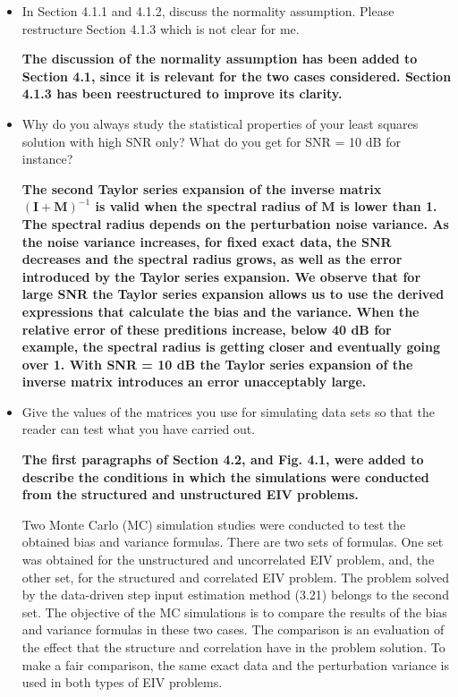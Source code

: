 \documentclass[11pt]{article}
\begin{document}
\begin{itemize}
    \item  In Section 4.1.1 and 4.1.2, discuss the normality assumption. Please restructure Section 4.1.3 which is not clear for me. 
    
    {\bfseries The discussion of the normality assumption has been added to Section 4.1, since it is relevant for the two cases considered. Section 4.1.3 has been reestructured to improve its clarity.}
    
    \item  Why do you always study the statistical properties of your least squares solution with high SNR only? What do you get for SNR = 10 dB for instance? 
    
    {\bfseries The second Taylor series expansion of the inverse matrix $(\mathbf{I} + \mathbf{M})^{-1}$ is valid when the spectral radius of $\mathbf{M}$ is lower than 1. The spectral radius depends on the perturbation noise variance. As the noise variance increases, for fixed exact data, the SNR decreases and the spectral radius grows, as well as the error introduced by the Taylor series expansion. We observe that for large SNR the Taylor series expansion allows us to use the derived expressions that calculate the bias and the variance. When the relative error of these preditions increase, below 40 dB for example, the spectral radius is getting closer and eventually going over 1. With SNR = 10 dB the Taylor series expansion of the inverse matrix introduces an error unacceptably large. }
    
    \item Give the values of the matrices you use for simulating data sets so that the reader can test what you have carried out. 
    
    {\bfseries The first paragraphs of Section 4.2, and Fig. 4.1, were added to describe the conditions in which the simulations were conducted from the structured and unstructured EIV problems.}

    \color{blue}
    Two Monte Carlo (MC) simulation studies were conducted to test the obtained bias and variance formulas.
    There are two sets of formulas.
    One set was obtained for the unstructured and uncorrelated EIV problem, and, the other set, for the structured and correlated EIV problem. 
    The problem solved by the data-driven step input estimation method (3.21) belongs to the second set.
    The objective of the MC simulations is to compare the results of the bias and variance formulas in these two cases. 
    The comparison is an evaluation of the effect that the structure and correlation have in the problem solution.
    To make a fair comparison, the same exact data and the perturbation variance is used in both types of EIV problems. 


\end{itemize}
\end{document}
